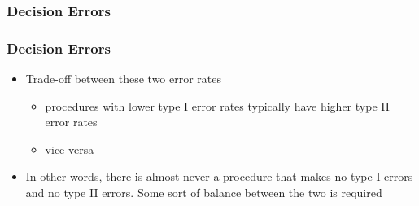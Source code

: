 \documentclass[handout]{beamer}
\newcommand{\blue}[1]{\textcolor{blue2}{#1}}
\begin{document}
\begin{frame}
\frametitle{Decision Errors}
%
%

\end{frame}


\begin{frame}
\frametitle{Decision Errors}
\begin{itemize}
\item Trade-off between these two error rates
\begin{itemize}
\item procedures with lower type I error rates typically have higher type II error rates
\item vice-versa
\end{itemize}
\pause \item In other words, there is almost never a procedure that makes no type I errors and no type II errors.  Some sort of balance between the two is required
\end{itemize}
\end{frame}
\end{document}
